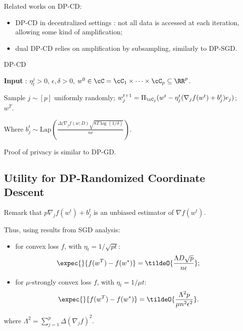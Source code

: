 \documentclass[notheorems]{beamer}
\begin{document}
\begin{frame}
  Related works on DP-CD:
  \begin{itemize}
  \item DP-CD in decentralized settings : not all data is accessed at each iteration, allowing some kind of amplification;
  \item dual DP-CD relies on amplification by subsampling, similarly to DP-SGD.
  \end{itemize}
\end{frame}

\begin{frame}
  \begin{algorithm}[H]
    \caption{DP-CD}
    \textbf{Input} : $\eta_t^j > 0$, $\epsilon, \delta > 0$, $w^0 \in \cC = \cC_1 \times \cdots \times \cC_p \subseteq \RR^p$.
    \begin{algorithmic}[1]
      \State Sample $j \sim [p]$ uniformly randomly;
      \State $w_j^{t+1} = \Pi_{\cC_j}(w^t - \eta^t_j (\nabla_j f(w^t) + b^t_j) e_j)$;
      \EndFor \\
      \Return $w^T$.
    \end{algorithmic}
  \end{algorithm}

  Where $b^t_j \sim \text{Lap}\left( \frac{\Delta(\nabla_j f(w; D) \sqrt{8 T \log(1/\delta)}}{n\epsilon} \right)$.

  \vspace{1em}

  Proof of privacy is similar to DP-GD.
\end{frame}

\subsection{Utility for DP-Randomized Coordinate Descent}
\label{sub:utility_for_dp_randomized_coordinate_descent}

\begin{frame}
  Remark that $p \nabla_j f(w^t) + b^t_j$ is an unbiased estimator of $\nabla f(w^t)$.

  Thus, using results from SGD analysis:
  \begin{itemize}
  \item for convex loss $f$, with $\eta_t = 1 / \sqrt{pt}$:
    \begin{align*}
      \expec{}{f(w^T) - f(w^*)}
      & = \tildeO{\frac{\Lambda D \sqrt{p}}{n\epsilon}};
    \end{align*}
  \item for $\mu$-strongly convex loss $f$, with $\eta_t = 1/\mu t$:
    \begin{align*}
      \expec{}{f(w^T) - f(w^*)}
      & = \tildeO{\frac{\Lambda^2 p}{\mu n^2\epsilon^2}}.
    \end{align*}
  \end{itemize}
  where $\Lambda^2 = \sum_{j=1}^p \Delta(\nabla_j f)^2$.
\end{frame}
\end{document}
